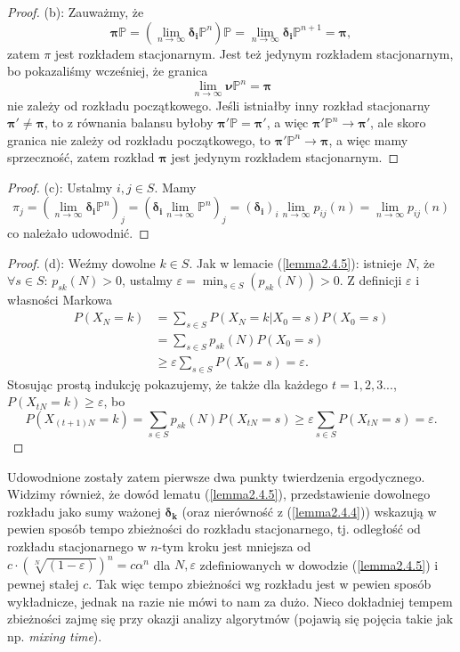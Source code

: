 \documentclass[a4paper]{article}
\theoremstyle{defn}
\theoremstyle{theorem}
\theoremstyle{lemma}
\theoremstyle{cor}
\theoremstyle{fact}
\begin{document}
\begin{proof}
(b): Zauważmy, że $$\boldsymbol{\pi}\mathbb{P} = (\lim\limits_{n \to \infty} \boldsymbol{\delta_i}\mathbb{P}^n)\mathbb{P} = \lim\limits_{n \to \infty} \boldsymbol{\delta_i}\mathbb{P}^{n+1} = \boldsymbol{\pi},$$ zatem $\pi$ jest rozkładem stacjonarnym.
Jest też jedynym rozkładem stacjonarnym, bo pokazaliśmy wcześniej, że granica $$\lim\limits_{n \to \infty} \boldsymbol{\nu}\mathbb{P}^n = \boldsymbol{\pi}$$ nie zależy od rozkładu początkowego. Jeśli istniałby inny rozkład stacjonarny $\boldsymbol{\pi'} \neq \boldsymbol{\pi}$, to z równania balansu byłoby $\boldsymbol{\pi'}\mathbb{P} = \boldsymbol{\pi'}$, a więc $\boldsymbol{\pi'}\mathbb{P}^n \to \boldsymbol{\pi'}$, ale skoro granica nie zależy od rozkładu początkowego, to $\boldsymbol{\pi'}\mathbb{P}^n \to \boldsymbol{\pi}$, a więc mamy sprzeczność, zatem rozkład $\boldsymbol{\pi}$ jest jedynym rozkładem stacjonarnym.
\end{proof}
\begin{proof}
(c): Ustalmy $i,j \in S$. Mamy $$\pi_j = (\lim\limits_{n \to \infty} \boldsymbol{\delta_i}\mathbb{P}^n)_j = (\boldsymbol{\delta_i} \lim\limits_{n \to \infty} \mathbb{P}^n)_j = (\boldsymbol{\delta_i})_i \lim\limits_{n \to \infty} p_{ij}(n) = \lim\limits_{n \to \infty} p_{ij}(n)$$ co należało udowodnić.
\end{proof}
\begin{proof}
(d): Weźmy dowolne $k \in S$. Jak w lemacie (\ref{lemma2.4.5}): istnieje $N$, że $\forall s \in S:\, p_{sk}(N) > 0$, ustalmy $\varepsilon = \min_{s \in S}(p_{sk}(N)) > 0$. Z definicji $\varepsilon$ i własności Markowa
\begin{align*}
P(X_N = k) &= \sum\limits_{s \in S} P(X_N = k|X_0 = s)P(X_0 = s) \\
&= \sum\limits_{s \in S} p_{sk}(N)P(X_0 = s) \\
&\geq \varepsilon \sum\limits_{s \in S} P(X_0 = s) = \varepsilon.
\end{align*}
Stosując prostą indukcję pokazujemy, że także dla każdego $t = 1,2,3...$, $P(X_{tN} = k) \geq \varepsilon$, bo
$$P(X_{(t+1)N} = k) = \sum\limits_{s \in S} p_{sk}(N)P(X_{tN} = s) \geq \varepsilon \sum\limits_{s \in S} P(X_{tN} = s) = \varepsilon.$$
\end{proof}
Udowodnione zostały zatem pierwsze dwa punkty twierdzenia ergodycznego. Widzimy również, że dowód lematu (\ref{lemma2.4.5}), przedstawienie dowolnego rozkładu jako sumy ważonej $\boldsymbol{\delta_k}$ (oraz nierówność z (\ref{lemma2.4.4})) wskazują w pewien sposób tempo zbieżności do rozkładu stacjonarnego, tj. odległość od rozkładu stacjonarnego w $n$-tym kroku jest mniejsza od $c \cdot (\sqrt[N]{(1-\varepsilon)})^n = c\alpha^n$ dla $N, \varepsilon$ zdefiniowanych w dowodzie (\ref{lemma2.4.5}) i pewnej stałej $c$. Tak więc tempo zbieżności wg rozkładu jest w pewien sposób wykładnicze, jednak na razie nie mówi to nam za dużo. Nieco dokładniej tempem zbieżności zajmę się przy okazji analizy algorytmów (pojawią się pojęcia takie jak np. \textit{mixing time}).
\\\\
\end{document}
